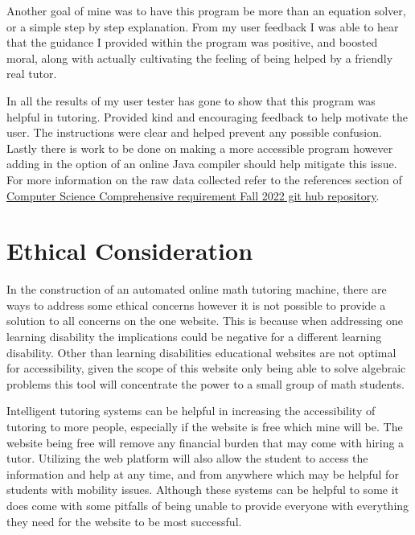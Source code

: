 \documentclass[10pt,twocolumn]{article}
\begin{document}
Another goal of mine was to have this program be more than an equation solver, or a simple step by step explanation. From my user feedback I was able to hear that the guidance I provided within the program was positive, and boosted moral, along with actually cultivating the feeling of being helped by a friendly real tutor. 

In all the results of my user tester has gone to show that this program was helpful in tutoring. Provided kind and encouraging feedback to help motivate the user. The instructions were clear and helped prevent any possible confusion. Lastly there is work to be done on making a more accessible program however adding in the option of an online Java compiler should help mitigate this issue. For more information on the raw data collected refer to the references section of \href{https://github.com/amthreatt/COMPS2022}{Computer Science Comprehensive requirement Fall 2022 git hub repository}.


\section{Ethical Consideration}
 In the construction of an automated online math tutoring machine, there are ways to address some ethical concerns however it is not possible to provide a solution to all concerns on the one website. This is because when addressing one learning disability the implications could be negative for a different learning disability. Other than learning disabilities educational websites are not optimal for accessibility, given the scope of this website only being able to solve algebraic problems this tool will concentrate the power to a small group of math students. 

Intelligent tutoring systems can be helpful in increasing the accessibility of tutoring to more people, especially if the website is free which mine will be. The website being free will remove any financial burden that may come with hiring a tutor. Utilizing the web platform will also allow the student to access the information and help at any time, and from anywhere which may be helpful for students with mobility issues. Although these systems can be helpful to some it does come with some pitfalls of being unable to provide everyone with everything they need for the website to be most successful. 
\end{document}
